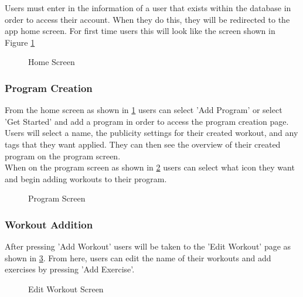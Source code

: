\documentclass{article}
\begin{document}
Users must enter in the information of a user that exists within the database in order to access their account. When they do this, they will be redirected to the app home screen. For first time users this will look like the screen shown in Figure \ref{FigHomeScreen} 

\begin{figure}[H]
    \centering
    \caption{Home Screen}
    \label{FigHomeScreen}
    \end{figure}

\subsubsection{Program Creation}

From the home screen as shown in \ref{FigHomeScreen} users can select 'Add Program' or select 'Get Started' and add a program in order to access the program creation page.\\
Users will select a name, the publicity settings for their created workout, and any tags that they want applied. They can then see the overview of their created program on the program screen.\\
When on the program screen as shown in \ref{FigProgramScreen} users can select what icon they want and begin adding workouts to their program.

\begin{figure}[H]
    \centering
    \caption{Program Screen}
    \label{FigProgramScreen}
    \end{figure}

\subsubsection{Workout Addition}

After pressing 'Add Workout' users will be taken to the 'Edit Workout' page as shown in \ref{FigEditWorkout}. From here, users can edit the name of their workouts and add exercises by pressing 'Add Exercise'.\\

\begin{figure}[H]
    \centering
    \caption{Edit Workout Screen}
    \label{FigEditWorkout}
    \end{figure}
\end{document}
